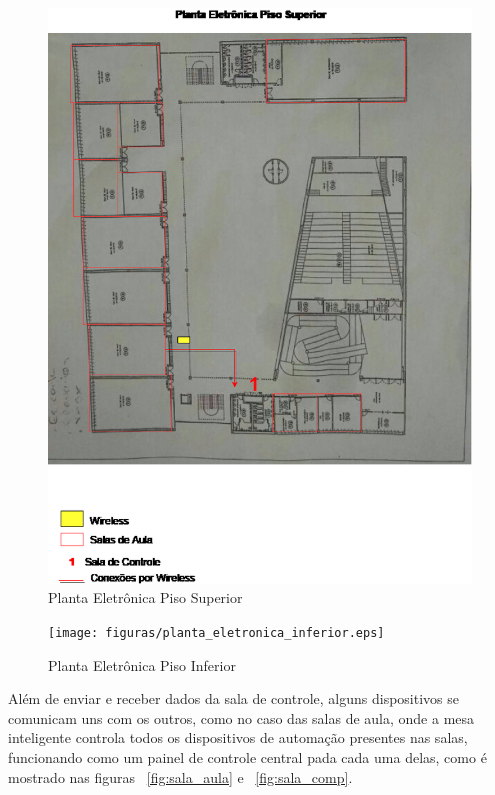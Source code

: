 \begin{figure}[!h]
  \centering
  \includegraphics[keepaspectratio=true,scale=0.4]{figuras/planta_eletronica_superior.eps}
  \caption{Planta Eletrônica Piso Superior}
  \label{fig:plant_sup}
\end{figure}

\begin{figure}[!h]
  \centering
  \texttt{[image: figuras/planta\_eletronica\_inferior.eps]}
  \caption{Planta Eletrônica Piso Inferior}
  \label{fig:plant_inf}
\end{figure}

Além de enviar e receber dados da sala de controle, alguns dispositivos se comunicam uns com os outros, como no caso das salas de aula, onde a mesa inteligente controla todos os dispositivos de automação presentes nas salas, funcionando como um painel de controle central pada cada uma delas, como é mostrado nas figuras ~\ref{fig:sala_aula} e ~\ref{fig:sala_comp}.

